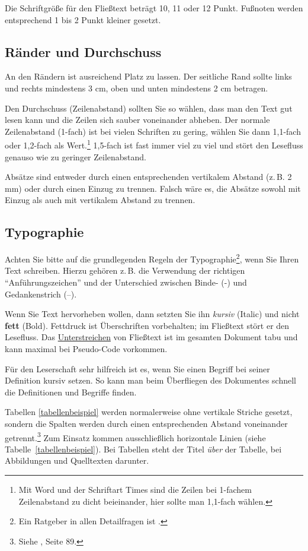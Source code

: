 \documentclass[a4paper,11pt,headings=normal]{scrartcl}
\begin{document}
Die Schriftgröße für den Fließtext beträgt 10, 11 oder 12 Punkt. Fußnoten werden entsprechend 1 bis 2 Punkt kleiner gesetzt.

\subsection{Ränder und Durchschuss}
An den Rändern  ist ausreichend Platz zu lassen. Der seitliche Rand sollte links und rechts mindestens 3 cm, oben und unten mindestens 2 cm betragen.

Den Durchschuss (Zeilenabstand) sollten Sie so wählen, dass man den Text gut lesen kann und die Zeilen sich sauber voneinander abheben. Der normale Zeilenabstand (1-fach) ist bei vielen Schriften zu gering, wählen Sie dann 1,1-fach oder 1,2-fach als Wert.\footnote{Mit Word und der Schriftart Times sind die Zeilen bei 1-fachem Zeilenabstand zu dicht beieinander, hier sollte man 1,1-fach wählen.} 1,5-fach ist fast immer viel zu viel und stört den Lesefluss genauso wie zu geringer Zeilenabstand.

Absätze sind entweder durch einen entsprechenden vertikalem Abstand (z.\,B. 2 mm) oder durch einen Einzug zu trennen. Falsch wäre es, die Absätze sowohl mit Einzug als auch mit vertikalem Abstand zu trennen.

\subsection{Typographie}
Achten Sie bitte auf die grundlegenden Regeln der Typographie\footnote{Ein Ratgeber in allen Detailfragen ist \autocite{Forssman2002}.}, wenn Sie Ihren Text schreiben. Hierzu gehören z.\,B. die Verwendung der richtigen "`Anführungszeichen"' und der Unterschied zwischen Binde- (-) und Gedankenstrich (--).

Wenn Sie Text hervorheben wollen, dann setzten Sie ihn \textit{kursiv} (Italic) und nicht \textbf{fett} (Bold). Fettdruck ist Überschriften vorbehalten; im Fließtext stört er den Lesefluss. Das \underline{Unterstreichen} von Fließtext ist im gesamten Dokument tabu und kann maximal bei Pseudo-Code vorkommen.

Für den Leserschaft sehr hilfreich ist es, wenn Sie einen Begriff bei seiner Definition kursiv setzen. So kann man beim Überfliegen des Dokumentes schnell die Definitionen und Begriffe finden.

Tabellen \ref{tabellenbeispiel} werden normalerweise ohne vertikale Striche gesetzt, sondern die Spalten werden durch einen entsprechenden Abstand voneinander getrennt.\footnote{Siehe \autocite{Willberg1999}, Seite 89.} Zum Einsatz kommen ausschließlich horizontale Linien (siehe Tabelle~\ref{tabellenbeispiel}). Bei Tabellen steht der Titel \textit{über} der Tabelle, bei Abbildungen und Quelltexten darunter.
\end{document}
